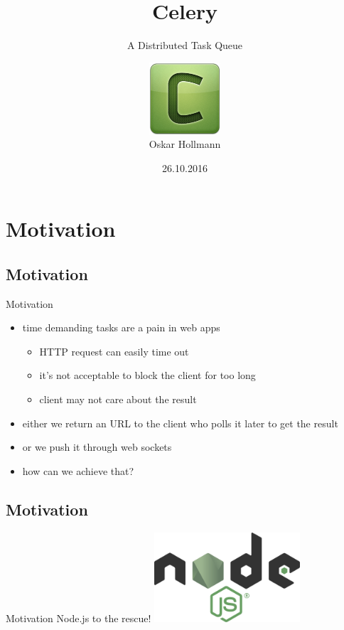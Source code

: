 \documentclass[xcolor=x11names,compress,t]{beamer}
\title{Celery}
\subtitle{A Distributed Task Queue}
\author[Oskar Hollmann]{\vspace{0.3em}\includegraphics[width=0.2\textwidth]{celery-logo}\\Oskar Hollmann}
\institute{User Technologies}
\date{26.10.2016}
\renewcommand{\(}{\begin{columns}[T]}
\renewcommand{\)}{\end{columns}}
\newcommand{\<}[1]{\begin{column}{#1}}
\renewcommand{\>}{\end{column}}
\newenvironment{slide}[1]{\subsection{#1} \begin{frame}{#1}}{\end{frame}}
\begin{document}
\maketitle

\section{Motivation}

\begin{slide}{Motivation}
    \begin{itemize} 
        \item time demanding tasks are a pain in web apps
            \begin{itemize}
                \item HTTP request can easily time out
                \item it's not acceptable to block the client for too long
                \item client may not care about the result
            \end{itemize}
        \item either we return an URL to the client who polls it later to get the result
        \item or we push it through web sockets
        \item how can we achieve that?
    \end{itemize}
\end{slide}

\begin{slide}{Motivation}
    \vspace{5em}
    \centering 
    {\Huge Node.js to the rescue!}
    \includegraphics[height=9em]{nodejs-logo}
\end{slide}
\end{document}
